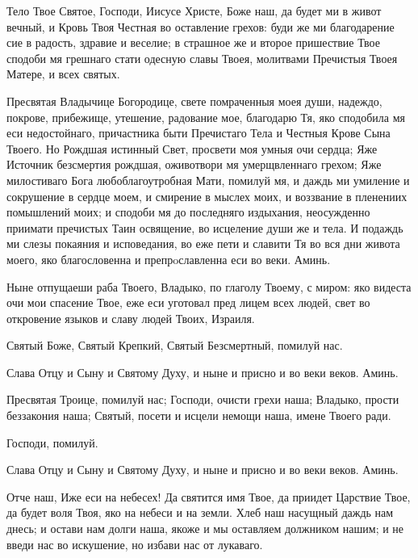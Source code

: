 \begin{mymulticols}

Тело Твое Святое, Господи, Иисусе Христе, Боже наш, да будет ми в живот вечный, и Кровь Твоя Честная во оставление грехов: буди же ми благодарение сие в радость, здравие и веселие; в страшное же и второе пришествие Твое сподоби мя грешнаго стати одесную славы Твоея, молитвами Пречистыя Твоея Матере, и всех святых.


Пресвятая Владычице Богородице, свете помраченныя моея души, надеждо, покрове, прибежище, утешение, радование мое, благодарю Тя, яко сподобила мя еси недостойнаго, причастника быти Пречистаго Тела и Честныя Крове Сына Твоего. Но Рождшая истинный Свет, просвети моя умныя очи сердца; Яже Источник безсмертия рождшая, оживотвори мя умерщвленнаго грехом; Яже милостиваго Бога любоблагоутробная Мати, помилуй мя, и даждь ми умиление и сокрушение в сердце моем, и смирение в мыслех моих, и воззвание в пленениих помышлений моих; и сподоби мя до последняго издыхания, неосужденно приимати пречистых Таин освящение, во исцеление души же и тела. И подаждь ми слезы покаяния и исповедания, во еже пети и славити Тя во вся дни живота моего, яко благословенна и препрoславленна еси во веки. Аминь.

Ныне отпущаеши раба Твоего, Владыко, по глаголу Твоему, с миром: яко видеста очи мои спасение Твое, еже еси уготовал пред лицем всех людей, свет во откровение языков и славу людей Твоих, Израиля.

Святый Боже, Святый Крепкий, Святый Безсмертный, помилуй нас. 

Слава Отцу и Сыну и Святому Духу, и ныне и присно и во веки веков. Аминь.

Пресвятая Троице, помилуй нас; Господи, очисти грехи наша; Владыко, прости беззакония наша; Святый, посети и исцели немощи наша, имене Твоего ради.

Господи, помилуй. 

Слава Отцу и Сыну и Святому Духу, и ныне и присно и во веки веков. Аминь.

Отче наш, Иже еси на небесех! Да святится имя Твое, да приидет Царствие Твое, да будет воля Твоя, яко на небеси и на земли. Хлеб наш насущный даждь нам днесь; и остави нам долги наша, якоже и мы оставляем должником нашим; и не введи нас во искушение, но избави нас от лукаваго.



\end{mymulticols}

